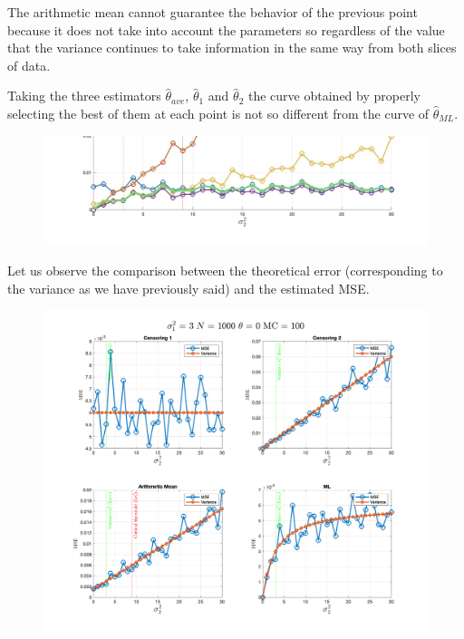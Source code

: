 The arithmetic mean cannot guarantee the behavior of the previous point because it does not take into account the parameters so regardless of the value that the variance continues to take information in the same way from both slices of data.

Taking the three estimators $\hat\theta_{ave}$, $\hat\theta_{1}$ and $\hat\theta_{2}$ the curve obtained by properly selecting the best of them at each point is not so different from the curve of $\hat \theta_{ML}$.

\begin{figure}[H]
    \centering
    \includegraphics[width=\textwidth]{./figures/appendix_a/figure_2.jpeg}
\end{figure}

Let us observe the comparison between the theoretical error (corresponding to the variance as we have previously said) and the estimated MSE.

\begin{figure}[H]
    \includegraphics[width=\textwidth]{./figures/appendix_a/figure_3.png}
\end{figure}


